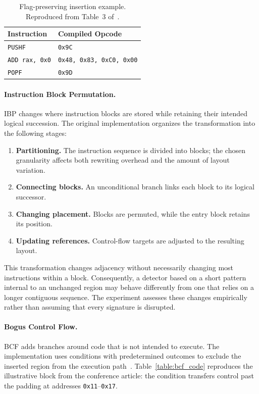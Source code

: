 \documentclass[runningheads]{llncs}
\begin{document}
\begin{table}[htbp]
    \centering
    \caption{Flag-preserving insertion example. Reproduced from Table~3 of~\cite{zone_secrypt_2026}.}
    \label{tab:flag_preserving_nop}
    \small
    \centering
    \setlength{\tabcolsep}{3pt}
    \begin{tabular}{ll}
        \hline
        \textbf{Instruction}    & \textbf{Compiled Opcode} \\ \hline
        \verb|PUSHF|             & \verb|0x9C|                \\ \hline
        \verb|ADD rax, 0x0|      & \verb|0x48, 0x83, 0xC0, 0x00| \\ \hline
        \verb|POPF|              & \verb|0x9D|                \\ \hline
    \end{tabular}
\end{table}

\paragraph{Instruction Block Permutation.}
IBP changes where instruction blocks are stored while retaining their intended logical succession. The original implementation organizes the transformation into the following stages:

\begin{enumerate}
\item \textbf{Partitioning.} The instruction sequence is divided into blocks; the chosen granularity affects both rewriting overhead and the amount of layout variation.
    \item \textbf{Connecting blocks.} An unconditional branch links each block to its logical successor.
    \item \textbf{Changing placement.} Blocks are permuted, while the entry block retains its position.
    \item \textbf{Updating references.} Control-flow targets are adjusted to the resulting layout.

\end{enumerate}

This transformation changes adjacency without necessarily changing most instructions within a block. Consequently, a detector based on a short pattern internal to an unchanged region may behave differently from one that relies on a longer contiguous sequence. The experiment assesses these changes empirically rather than assuming that every signature is disrupted.
\paragraph{Bogus Control Flow.}
BCF adds branches around code that is not intended to execute. The implementation uses conditions with predetermined outcomes to exclude the inserted region from the execution path~\cite{bin2binobf,llvmobf}. Table~\ref{table:bcf_code} reproduces the illustrative block from the conference article: the condition transfers control past the padding at addresses \texttt{0x11}--\texttt{0x17}.
\end{document}
